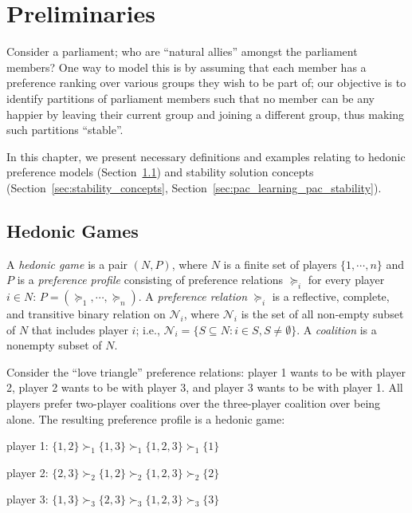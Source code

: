 
\chapter{Preliminaries}
\label{ch:preliminaries}
\vspace{2em}

Consider a parliament; who are ``natural allies'' amongst the parliament members?
One way to model this is by assuming that each member has a preference ranking 
over various groups they wish to be part of; 
our objective is to identify partitions of parliament members such that no member
can be any happier by leaving their current group and joining a different group, 
thus making such partitions ``stable''.

In this chapter, we present necessary definitions and examples relating to
hedonic preference models (Section~\ref{sec:hedonic_game}) and
stability solution concepts (Section~\ref{sec:stability_concepts},
Section~\ref{sec:pac_learning_pac_stability}).

\section{Hedonic Games}
\label{sec:hedonic_game}

A \textit{hedonic game} is a pair $(N, P)$, where $N$ is a finite set of players
$\{1, \cdots, n\}$ and $P$ is a \textit{preference profile} consisting of
preference relations $\succeq_i$ for every player $i \in N$:
$P = (\succeq_1, \cdots, \succeq_n)$.
A \textit{preference relation} $\succeq_i$ is a reflective, complete, and
transitive binary relation on $\mathcal{N}_i$, where $\mathcal{N}_i$ is the set
of all non-empty subset of $N$ that includes player $i$;
i.e., $\mathcal{N}_i = \{S \subseteq N: i \in S, S \neq \emptyset \}$.
A \textit{coalition} is a nonempty subset of $N$.

\begin{example}
\label{example:not_top_responsive_pref}
  Consider the ``love triangle'' preference relations: player 1 wants
  to be with player 2, player 2 wants to be with player 3, and player 3 wants to
  be with player 1. All players prefer two-player coalitions over the three-player
  coalition over being alone.
  The resulting preference profile is a hedonic game:

  player 1: $\{1, 2\} \succ_1 \{1, 3\} \succ_1 \{1, 2, 3\} \succ_1  \{1\}$

  player 2: $\{2, 3\} \succ_2 \{1, 2\} \succ_2 \{1, 2, 3\} \succ_2  \{2\}$

  player 3: $\{1, 3\} \succ_3 \{2, 3\} \succ_3 \{1, 2, 3\} \succ_3  \{3\}$
\end{example}

